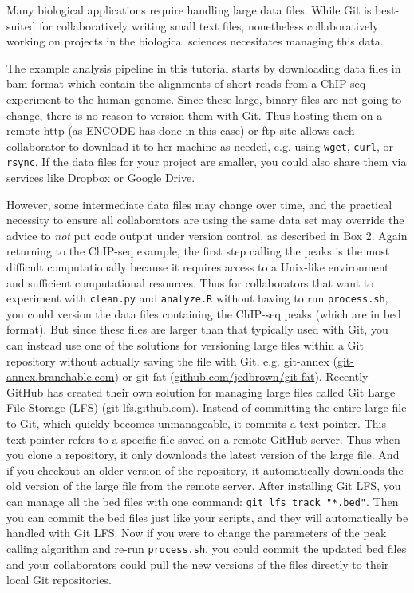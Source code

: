 \documentclass[10pt]{article}
\begin{document}
Many biological applications require handling large data files.
While Git is best-suited for collaboratively writing small text files, nonetheless collaboratively working on projects in the biological sciences necesitates managing this data.

The example analysis pipeline in this tutorial starts by downloading data files in bam format which contain the alignments of short reads from a ChIP-seq experiment to the human genome.
Since these large, binary files are not going to change, there is no reason to version them with Git.
Thus hosting them on a remote http (as ENCODE has done in this case) or ftp site allows each collaborator to download it to her machine as needed, e.g. using \verb|wget|, \verb|curl|, or \verb|rsync|.
If the data files for your project are smaller, you could also share them via services like Dropbox or Google Drive.

However, some intermediate data files may change over time, and the practical necessity to ensure all collaborators are using the same data set may override the advice to \textit{not} put code output under version control, as described in Box 2.
Again returning to the ChIP-seq example, the first step calling the peaks is the most difficult computationally because it requires access to a Unix-like environment and sufficient computational resources.
Thus for collaborators that want to experiment with \verb|clean.py| and \verb|analyze.R| without having to run \verb|process.sh|, you could version the data files containing the ChIP-seq peaks (which are in bed format).
But since these files are larger than that typically used with Git, you can instead use one of the solutions for versioning large files within a Git repository without actually saving the file with Git, e.g. git-annex (\href{https://git-annex.branchable.com/}{git-annex.branchable.com}) or git-fat (\href{https://github.com/jedbrown/git-fat/}{github.com/jedbrown/git-fat}).
Recently GitHub has created their own solution for managing large files called Git Large File Storage (LFS) (\href{https://git-lfs.github.com/}{git-lfs.github.com}).
Instead of committing the entire large file to Git, which quickly becomes unmanageable, it commits a text pointer.
This text pointer refers to a specific file saved on a remote GitHub server.
Thus when you clone a repository, it only downloads the latest version of the large file.
And if you checkout an older version of the repository, it automatically downloads the old version of the large file from the remote server.
After installing Git LFS, you can manage all the bed files with one command: \verb|git lfs track "*.bed"|.
Then you can commit the bed files just like your scripts, and they will automatically be handled with Git LFS.
Now if you were to change the parameters of the peak calling algorithm and re-run \verb|process.sh|, you could commit the updated bed files and your collaborators could pull the new versions of the files directly to their local Git repositories.
\end{document}
